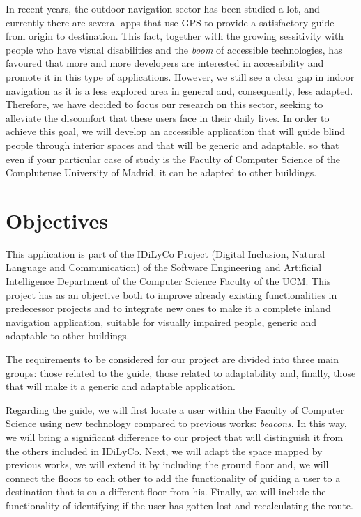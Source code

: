 In recent years, the outdoor navigation sector has been studied a lot, and currently there are several apps that use GPS to provide a satisfactory guide from origin to destination. This fact, together with the growing sessitivity with people who have visual disabilities and the \textit{boom} of accessible technologies, has favoured that more and more developers are interested in accessibility and promote it in this type of applications. However, we still see a clear gap in indoor navigation as it is a less explored area in general and, consequently, less adapted. Therefore, we have decided to focus our research on this sector, seeking to alleviate the discomfort that these users face in their daily lives. In order to achieve this goal, we will develop an accessible application that will guide blind people through interior spaces and that will be generic and adaptable, so that even if your particular case of study is the Faculty of Computer Science of the Complutense University of Madrid, it can be adapted to other buildings. 


\section{Objectives}
This application is part of the IDiLyCo Project (Digital Inclusion, Natural Language and Communication) of the
Software Engineering and Artificial Intelligence Department of the Computer Science Faculty of the UCM. This project has
as an objective both to improve already existing functionalities in predecessor projects and to integrate new ones to make it a complete inland navigation application, suitable for visually impaired people, generic and adaptable to other buildings.

The requirements to be considered for our project are divided into three main groups: those related to the guide, those related to adaptability and, finally, those that will make it a generic and adaptable application.

Regarding the guide, we will first locate a user within the Faculty of Computer Science using new technology compared to previous works: \textit{beacons}. In this way, we will bring a significant difference to our project that will distinguish it from the others included in IDiLyCo. Next, we will adapt the space mapped by previous works, we will extend it by including the ground floor and, we will connect the floors to each other to add the functionality of guiding a user to a destination that is on a different floor from his. Finally, we will include the functionality of identifying if the user has gotten lost and recalculating the route.


